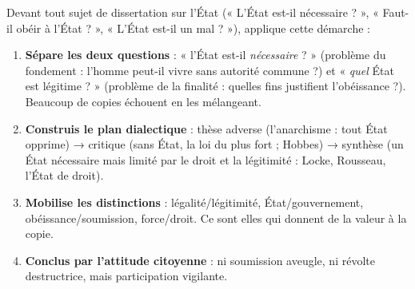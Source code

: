 \documentclass[11pt]{article}
\begin{document}
\begin{methode}
Devant tout sujet de dissertation sur l'État (« L'État est-il nécessaire ? », « Faut-il obéir à l'État ? », « L'État est-il un mal ? »), applique cette démarche :
\begin{enumerate}
\item \textbf{Sépare les deux questions} : « l'État est-il \emph{nécessaire} ? » (problème du fondement : l'homme peut-il vivre sans autorité commune ?) et « \emph{quel} État est légitime ? » (problème de la finalité : quelles fins justifient l'obéissance ?). Beaucoup de copies échouent en les mélangeant.
\item \textbf{Construis le plan dialectique} : thèse adverse (l'anarchisme : tout État opprime) → critique (sans État, la loi du plus fort ; Hobbes) → synthèse (un État nécessaire mais limité par le droit et la légitimité : Locke, Rousseau, l'État de droit).
\item \textbf{Mobilise les distinctions} : légalité/légitimité, État/gouvernement, obéissance/soumission, force/droit. Ce sont elles qui donnent de la valeur à la copie.
\item \textbf{Conclus par l'attitude citoyenne} : ni soumission aveugle, ni révolte destructrice, mais participation vigilante.
\end{enumerate}
\end{methode}
\end{document}
